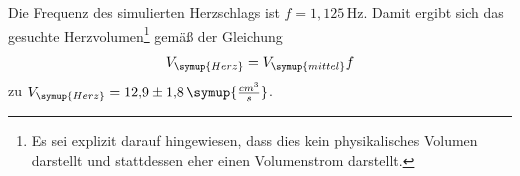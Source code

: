 Die Frequenz des simulierten Herzschlags ist $f=1{,}125\,$Hz. Damit ergibt sich
das gesuchte Herzvolumen\footnote{Es sei explizit darauf hingewiesen, dass dies kein
physikalisches Volumen darstellt und stattdessen eher einen Volumenstrom darstellt.} gemäß der Gleichung
\begin{equation}
  V_{\symup{Herz}} = V_{\symup{mittel}} f
\end{equation}
zu $V_{\symup{Herz}}=12{,}9\pm1{,}8\, \symup{\frac{cm^3}{s}}$.
